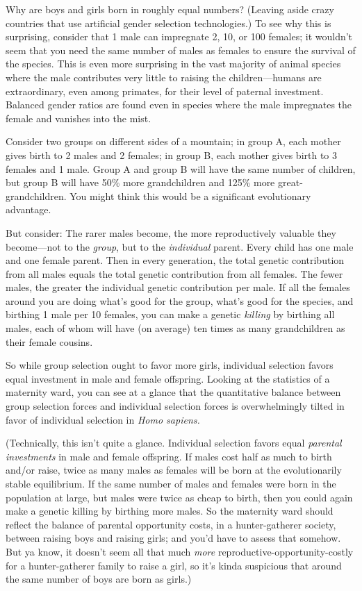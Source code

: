 {
 Why are boys and girls born in roughly equal numbers? (Leaving
aside crazy countries that use artificial gender selection
technologies.) To see why this is surprising, consider that 1 male can
impregnate 2, 10, or 100 females; it wouldn't seem that
you need the same number of males as females to ensure the survival of
the species. This is even more surprising in the vast majority of
animal species where the male contributes very little to raising the
children---humans are extraordinary, even among primates, for their
level of paternal investment. Balanced gender ratios are found even in
species where the male impregnates the female and vanishes into the
mist.}

{
 Consider two groups on different sides of a mountain; in group A,
each mother gives birth to 2 males and 2 females; in group B, each
mother gives birth to 3 females and 1 male. Group A and group B will
have the same number of children, but group B will have 50\% more
grandchildren and 125\% more great-grandchildren. You might think this
would be a significant evolutionary advantage.}

{
 But consider: The rarer males become, the more reproductively
valuable they become---not to the \textit{group}, but to the
\textit{individual} parent. Every child has one male and one female
parent. Then in every generation, the total genetic contribution from
all males equals the total genetic contribution from all females. The
fewer males, the greater the individual genetic contribution per male.
If all the females around you are doing what's good for
the group, what's good for the species, and birthing 1
male per 10 females, you can make a genetic \textit{killing} by
birthing all males, each of whom will have (on average) ten times as
many grandchildren as their female cousins.}

{
 So while group selection ought to favor more girls, individual
selection favors equal investment in male and female offspring. Looking
at the statistics of a maternity ward, you can see at a glance that the
quantitative balance between group selection forces and individual
selection forces is overwhelmingly tilted in favor of individual
selection in \textit{Homo sapiens.}}

{
 (Technically, this isn't quite a glance.
Individual selection favors equal \textit{parental investments} in male
and female offspring. If males cost half as much to birth and/or raise,
twice as many males as females will be born at the evolutionarily
stable equilibrium. If the same number of males and females were born
in the population at large, but males were twice as cheap to birth,
then you could again make a genetic killing by birthing more males. So
the maternity ward should reflect the balance of parental opportunity
costs, in a hunter-gatherer society, between raising boys and raising
girls; and you'd have to assess that somehow. But ya
know, it doesn't seem all that much \textit{more}
reproductive-opportunity-costly for a hunter-gatherer family to raise a
girl, so it's kinda suspicious that around the same
number of boys are born as girls.)}

